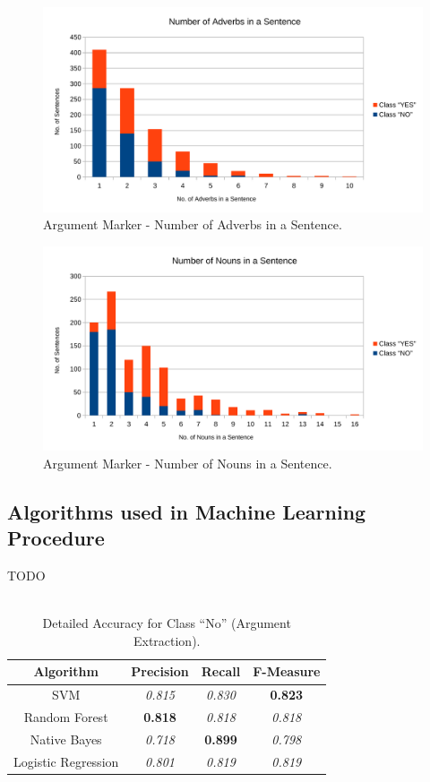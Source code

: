 \begin{figure}[H]
\centering
\includegraphics[width=0.8\linewidth]{figure/arguments/A_adverbs1.pdf}
\caption{Argument Marker - Number of Adverbs in a Sentence.}
\end{figure}

\begin{figure}[H]
\centering
\includegraphics[width=0.8\linewidth]{figure/arguments/A_nouns1.pdf}
\caption{Argument Marker - Number of Nouns in a Sentence.}
\end{figure}

\subsection{Algorithms used in Machine Learning Procedure}\label{412_ref}
TODO\\
\\

\begin{table}[H]
\centering
\caption{Detailed Accuracy for Class “No” (Argument Extraction).}
\label{41_table_ref}
\begin{tabular}{cccc}
\hline
{\bf Algorithm}     & {\bf Precision} & {\bf Recall}    & {\bf F-Measure} \\ \hline
SVM                 & {\it 0.815}     & {\it 0.830}     & {\bf 0.823} \\
Random Forest       & {\bf 0.818} 	 & {\it 0.818}     & {\it 0.818}     \\
Native Bayes        & {\it 0.718}     & {\bf 0.899}     & {\it 0.798}     \\
Logistic Regression & {\it 0.801}     & {\it 0.819}     & {\it 0.819}     \\ \hline
\end{tabular}
\end{table}

